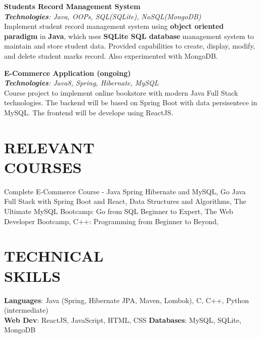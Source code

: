 \documentclass[resmargin]{res}
\begin{document}
\begin{resume}
\textbf{Students Record Management System \href{https://github.com/malavp1998/springboot-with-mongoDB}{\faGitSquare} \href{https://github.com/malavp1998/spring-boot-SqliteDB}{\faGitSquare}} {\sl  \hfill}
\\{\sl \textbf{Technologies}: Java, OOPs, SQL(SQLite), NoSQL(MongoDB)}
\\ Implement student record management system using \textbf{object oriented paradigm} in \textbf{Java}, which uses \textbf{SQLite SQL database} management system to maintain and store student data. Provided capabilities to create, display, modify, and delete student marks record. Also experimented with MongoDB.

\textbf{E-Commerce Application (ongoing)} {\sl  \hfill}
\\{\sl \textbf{Technologies}: Java8, Spring, Hibernate, MySQL }
\\ Course project to implement online bookstore with modern Java Full Stack technologies. The backend will be based on Spring Boot with data persisentece in MySQL. The frontend will be develope using ReactJS.


\section{RELEVANT\\ COURSES}
Complete E-Commerce Course - Java Spring Hibernate and MySQL, Go Java Full Stack with Spring Boot and React, Data Structures and Algorithms, The Ultimate MySQL Bootcamp: Go from SQL Beginner to Expert, The Web Developer Bootcamp, C++: Programming from Beginner to Beyond,

\section{TECHNICAL\\SKILLS}

\textbf{Languages}: Java (Spring, Hibernate JPA, Maven, Lombok), C, C++, Python (intermediate) \\
\textbf{Web Dev}: ReactJS, JavaScript, HTML, CSS            \qquad \textbf{Databases}: MySQL, SQLite, MongoDB





\end{resume}
\end{document}
